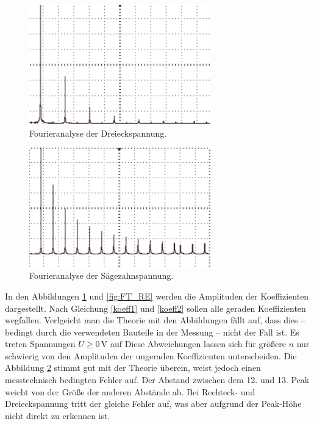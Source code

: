 \begin{figure}
	\centering
		\includegraphics[width=0.7\textwidth]{Bilder/FT_DE2.pdf}		
\caption{Fourieranalyse der Dreieckspannung.}
	\label{fig:FT_DE}
\end{figure}


\begin{figure}
	\centering
		\includegraphics[width=0.7\textwidth]{Bilder/FT_SZ.pdf}		
\caption{Fourieranalyse der Sägezahnspannung.}
	\label{fig:FT_SZ}
\end{figure}

In den Abbildungen \ref{fig:FT_DE} und \ref{fig:FT_RE} werden die Amplituden der Koeffizienten dargestellt. Nach Gleichung  \eqref{koeff1} und \eqref{koeff2} sollen alle geraden Koeffizienten wegfallen. Verlgeicht man die Theorie mit den Abbildungen fällt auf, dass dies -- bedingt durch die verwendeten Bauteile in der Messung -- nicht der Fall ist. Es treten Spannungen $U\geqslant0\,\si\volt$ auf Diese Abweichungen lassen sich für größere $n$ nur schwierig von den Amplituden der ungeraden Koeffizienten unterscheiden.
Die Abbildung \ref{fig:FT_SZ} stimmt gut mit der Theorie überein, weist jedoch einen messtechnisch bedingten Fehler auf. Der Abstand zwischen dem 12. und 13. Peak weicht von der Größe der anderen Abstände ab. Bei Rechteck- und Dreieckspannung tritt der gleiche Fehler auf, was aber aufgrund der Peak-Höhe nicht direkt zu erkennen ist.

